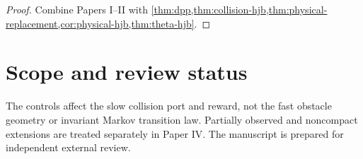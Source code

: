 \documentclass[11pt,reqno]{amsart}
\theoremstyle{definition}
\theoremstyle{remark}
\begin{document}
\begin{proof}
Combine Papers I--II with
\cref{thm:dpp,thm:collision-hjb,thm:physical-replacement,cor:physical-hjb,thm:theta-hjb}.
\end{proof}

\section*{Scope and review status}

The controls affect the slow collision port and reward, not the fast obstacle
geometry or invariant Markov transition law.  Partially observed and
noncompact extensions are treated separately in Paper IV.  The manuscript is
prepared for independent external review.



\end{document}
